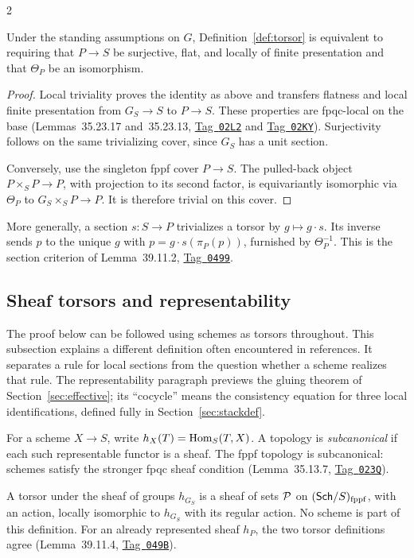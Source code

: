 \documentclass[12pt]{memoir}
\newcommand{\BGtag}[1]{\href{https://stacks.math.columbia.edu/tag/#1}{Tag~\texttt{#1}}}
\begin{document}
\begin{multicols}{2}
\begin{Prop}\label{prop:torsorcriterion}
Under the standing assumptions on $G$, Definition~\ref{def:torsor} is
equivalent to requiring that $P\to S$ be surjective, flat, and locally
of finite presentation and that $\Theta_P$ be an isomorphism.
\end{Prop}
\begin{proof}
Local triviality proves the identity as above and transfers flatness and
local finite presentation from $G_S\to S$ to $P\to S$. These properties
are fpqc-local on the base (Lemmas~35.23.17 and~35.23.13,
\BGtag{02L2} and \BGtag{02KY}). Surjectivity follows on the same
trivializing cover, since $G_S$ has a unit section.

Conversely, use the singleton fppf cover $P\to S$. The pulled-back
object $P\times_S P\to P$, with projection to its second factor, is
equivariantly isomorphic via $\Theta_P$ to $G_S\times_S P\to P$.
It is therefore trivial on this cover.
\end{proof}

More generally, a section $s:S\to P$ trivializes a torsor by
$g\mapsto g\cdot s$. Its inverse sends $p$ to the unique $g$ with
$p=g\cdot s(\pi_P(p))$, furnished by $\Theta_P^{-1}$. This is the
section criterion of Lemma~39.11.2, \BGtag{0499}.

\subsection{Sheaf torsors and representability}
The proof below can be followed using schemes as torsors throughout.
This subsection explains a different definition often encountered in
references. It separates a rule for local sections from the question
whether a scheme realizes that rule.
The representability paragraph previews the gluing theorem of
Section~\ref{sec:effective}; its ``cocycle'' means the consistency
equation for three local identifications, defined fully in
Section~\ref{sec:stackdef}.

For a scheme $X\to S$, write $h_X(T)=\operatorname{Hom}_S(T,X)$. A topology is
\emph{subcanonical} if each such representable functor is a sheaf.
The fppf topology is subcanonical: schemes satisfy the stronger fpqc
sheaf condition (Lemma~35.13.7, \BGtag{023Q}).

A torsor under the sheaf of groups $h_{G_S}$ is a sheaf of sets
$\mathcal{P}$ on $(\mathsf{Sch}/S)_{\mathrm{fppf}}$, with an action, locally isomorphic
to $h_{G_S}$ with its regular action. No scheme is part of this definition.
For an already represented sheaf $h_P$, the two torsor definitions agree
(Lemma~39.11.4, \BGtag{049B}).


\end{multicols}
\end{document}
